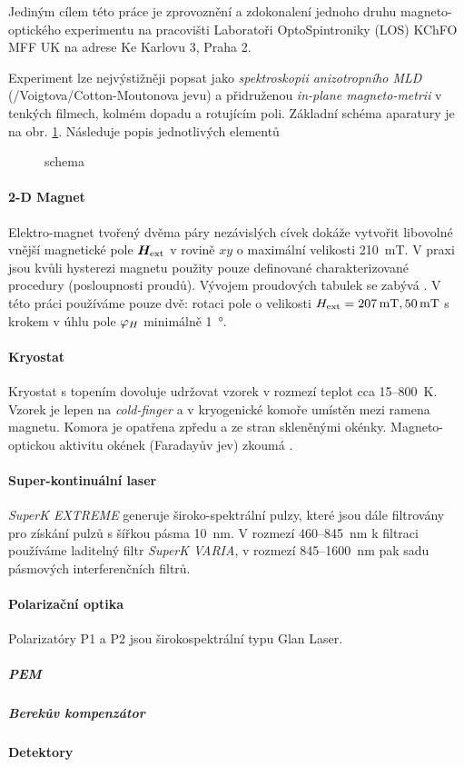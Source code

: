 Jediným cílem této práce je zprovoznění a zdokonalení jednoho druhu magneto-optického experimentu na pracovišti Laboratoři OptoSpintroniky (LOS) KChFO MFF UK na adrese Ke Karlovu 3, Praha 2.

Experiment lze nejvýstižněji popsat jako \emph{spektroskopii anizotropního MLD} (/Voigtova/Cotton-Moutonova jevu) a přidruženou \emph{in-plane magneto-metrii} v tenkých filmech, kolmém dopadu a rotujícím poli.
Základní schéma aparatury je na obr. \ref{fig:zakladni-schema}.
Následuje popis jednotlivých elementů

\begin{figure}[htbp]
    \centering
    \caption{schema}
    \label{fig:zakladni-schema}
\end{figure}

\paragraph{2-D Magnet}
Elektro-magnet tvořený dvěma páry nezávislých cívek dokáže vytvořit libovolné vnější magnetické pole $\bm{H}_\textrm{ext}$ v rovině $xy$ o maximální velikosti \SI{210}{\milli\tesla}.
V praxi jsou kvůli hysterezi magnetu použity pouze definované charakterizované procedury (posloupnosti proudů).
Vývojem proudových tabulek se zabývá .
V této práci používáme pouze dvě: rotaci pole o velikosti $H_\textrm{ext}=\SI{207}{\milli\tesla}, \SI{50}{\milli\tesla}$ s krokem v úhlu pole $\varphi_H$ minimálně \SI{1}{\degree}.

\paragraph{Kryostat}
Kryostat s topením dovoluje udržovat vzorek v rozmezí teplot cca 15--\tododash\SI{800}{\kelvin}.
Vzorek je lepen na \emph{cold-finger} a v kryogenické komoře umístěn mezi ramena magnetu.
Komora je opatřena zpředu a ze stran skleněnými okénky.
Magneto-optickou aktivitu okének (Faradayův jev) zkoumá .

\paragraph{Super-kontinuální laser}
\emph{SuperK EXTREME} generuje široko-spektrální pulzy, které jsou dále filtrovány pro získání pulzů s šířkou pásma \SI{10}{\nano\meter}.
V rozmezí \num{460}--\SI{845}{\nano\meter} k filtraci používáme laditelný filtr \emph{SuperK VARIA}, v rozmezí \num{845}--\tododash\SI{1600}{\nano\meter} pak sadu pásmových interferenčních filtrů.

\paragraph{Polarizační optika}
Polarizatóry P1 a P2 jsou širokospektrální typu Glan Laser.

\subparagraph{PEM}
\subparagraph{Berekův kompenzátor}

\paragraph{Detektory}
